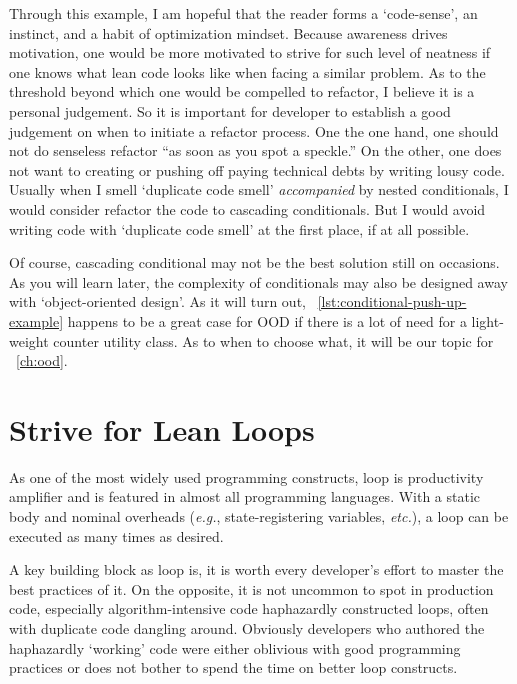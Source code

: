 \documentclass[oneside,11pt]{book}
\theoremstyle{definition}
\theoremstyle{remark}
\begin{document}
Through this example, I am hopeful that the reader forms a `code-sense', an instinct, and a habit
of optimization mindset.
Because awareness drives motivation,
one would be more motivated to strive for such level of neatness if one knows
what lean code looks like when facing a similar problem.
As to the threshold beyond which one would be compelled to refactor, I believe it is a
personal judgement.
So it is important for developer to establish a good judgement on when to initiate a refactor
process.
One the one hand, one should not do senseless refactor ``as soon as you spot a speckle.''
On the other, one does not want to creating or pushing off paying technical debts
by writing lousy code.
Usually when I smell `duplicate code smell' \emph{accompanied} by nested conditionals, I would
consider refactor the code to cascading conditionals.
But I would avoid writing code with `duplicate code smell' at the first place, if at all possible.


Of course, cascading conditional may not be the best solution still on occasions.
As you will learn later, the complexity of conditionals may also be designed away with
`object-oriented design'.
As it will turn out, ~\autoref{lst:conditional-push-up-example} happens to be a great
case for OOD if there is a lot of need for a light-weight counter utility class.
As to when to choose what, it will be our topic for ~\autoref{ch:ood}.
\clearpage{}
    \clearpage{}

\chapter{Strive for Lean Loops} \label{ch:loops}

As one of the most widely used programming constructs, loop is productivity
amplifier and is featured in almost all programming languages.
With a static body and nominal overheads (\textit{e.g.},
state-registering variables, \textit{etc.}), a loop can be executed as many times as desired.


A key building block as loop is, it is worth every developer's effort to master the best
practices of it.
On the opposite, it is not uncommon to spot in production code, especially algorithm-intensive code
haphazardly constructed loops, often with duplicate code dangling around.
Obviously developers who authored the haphazardly `working' code were either oblivious
with good programming practices or does not bother to spend the time on better loop constructs.
\end{document}
